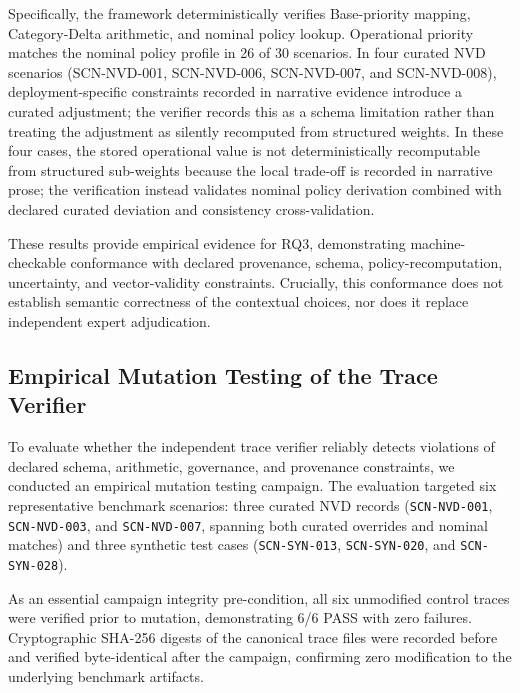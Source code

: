 \documentclass[conference]{IEEEtran}
\begin{document}
Specifically, the framework deterministically verifies Base-priority mapping, Category-Delta arithmetic, and nominal policy lookup. Operational priority matches the nominal policy profile in 26 of 30 scenarios. In four curated NVD scenarios (SCN-NVD-001, SCN-NVD-006, SCN-NVD-007, and SCN-NVD-008), deployment-specific constraints recorded in narrative evidence introduce a curated adjustment; the verifier records this as a schema limitation rather than treating the adjustment as silently recomputed from structured weights. In these four cases, the stored operational value is not deterministically recomputable from structured sub-weights because the local trade-off is recorded in narrative prose; the verification instead validates nominal policy derivation combined with declared curated deviation and consistency cross-validation.

These results provide empirical evidence for RQ3, demonstrating machine-checkable conformance with declared provenance, schema, policy-recomputation, uncertainty, and vector-validity constraints. Crucially, this conformance does not establish semantic correctness of the contextual choices, nor does it replace independent expert adjudication.

\subsection{Empirical Mutation Testing of the Trace Verifier}

To evaluate whether the independent trace verifier reliably detects violations of declared schema, arithmetic, governance, and provenance constraints, we conducted an empirical mutation testing campaign. The evaluation targeted six representative benchmark scenarios: three curated NVD records (\texttt{SCN-NVD-001}, \texttt{SCN-NVD-003}, and \texttt{SCN-NVD-007}, spanning both curated overrides and nominal matches) and three synthetic test cases (\texttt{SCN-SYN-013}, \texttt{SCN-SYN-020}, and \texttt{SCN-SYN-028}).

As an essential campaign integrity pre-condition, all six unmodified control traces were verified prior to mutation, demonstrating 6/6 PASS with zero failures. Cryptographic SHA-256 digests of the canonical trace files were recorded before and verified byte-identical after the campaign, confirming zero modification to the underlying benchmark artifacts.
\end{document}
